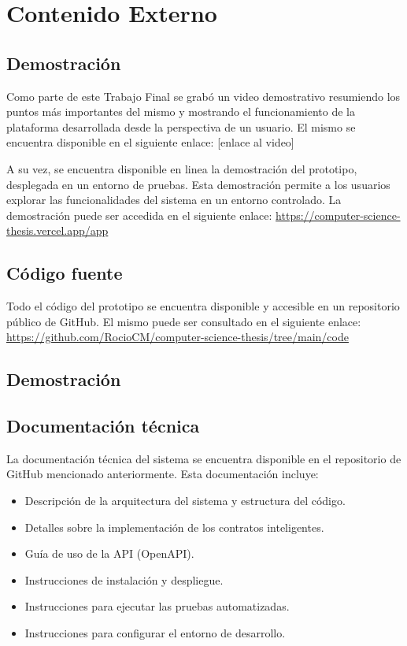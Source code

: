 \chapter{Contenido Externo}
\label{cp:annex-content}

\parindent0pt

\section{Demostración}

Como parte de este Trabajo Final se grabó un video demostrativo resumiendo los puntos más importantes del mismo y mostrando el funcionamiento de la plataforma desarrollada desde la perspectiva de un usuario. El mismo se encuentra disponible en el siguiente enlace: [enlace al video] %

A su vez, se encuentra disponible en linea la demostración del prototipo, desplegada en un entorno de pruebas. Esta demostración permite a los usuarios explorar las funcionalidades del sistema en un entorno controlado. La demostración puede ser accedida en el siguiente enlace: \url{https://computer-science-thesis.vercel.app/app}

\section{Código fuente}

Todo el código del prototipo se encuentra disponible y accesible en un repositorio público de GitHub. El mismo puede ser consultado en el siguiente enlace: \url{https://github.com/RocioCM/computer-science-thesis/tree/main/code}

\section{Demostración}

\section{Documentación técnica}

La documentación técnica del sistema se encuentra disponible en el repositorio de GitHub mencionado anteriormente. Esta documentación incluye:
\begin{itemize}
		\item Descripción de la arquitectura del sistema y estructura del código.
		\item Detalles sobre la implementación de los contratos inteligentes.
		\item Guía de uso de la API (OpenAPI).
		\item Instrucciones de instalación y despliegue.
		\item Instrucciones para ejecutar las pruebas automatizadas.
		\item Instrucciones para configurar el entorno de desarrollo.
\end{itemize}
